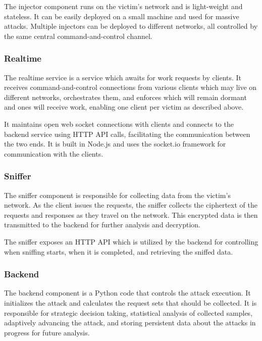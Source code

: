 The injector component runs on the victim's network and is light-weight and
stateless. It can be easily deployed on a small machine and used for massive
attacks. Multiple injectors can be deployed to different networks, all
controlled by the same central command-and-control channel.

\subsubsection{Realtime}

The realtime service is a service which awaits for work requests by clients. It
receives command-and-control connections from various clients which may live on
different networks, orchestrates them, and enforces which will remain dormant
and ones will receive work, enabling one client per victim as described above.

It maintains open web socket connections with clients and connects to the
backend service using HTTP API calls, facilitating the communication between the
two ends. It is built in Node.js and uses the socket.io framework for
communication with the clients.

\subsubsection{Sniffer}

The sniffer component is responsible for collecting data from the
victim's network. As the client issues the requests, the sniffer
collects the ciphertext of the requests and responses as they
travel on the network. This encrypted data is then transmitted to the backend
for further analysis and decryption.

The sniffer exposes an HTTP API which is utilized by the backend for controlling
when sniffing starts, when it is completed, and retrieving the sniffed data.

\subsubsection{Backend}

The backend component is a Python code that controls the attack execution. It
initializes the attack and calculates the request sets that should be
collected. It is responsible for strategic decision taking, statistical
analysis of collected samples, adaptively advancing the attack, and storing
persistent data about the attacks in progress for future analysis.

